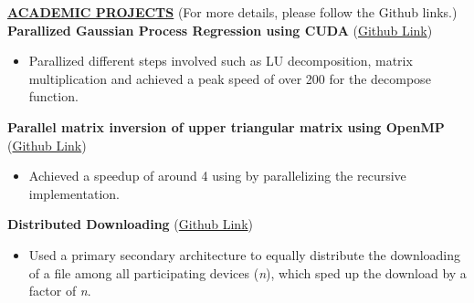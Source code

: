 \documentclass{article}
\begin{document}
%
%

\noindent \textbf{\underline{ACADEMIC PROJECTS}} (For more details, please follow the Github links.) \\
\noindent \textbf{Parallized Gaussian Process Regression using CUDA} (\href{https://github.com/biradarganesh25/Parallized-Gaussian-Process-Regression-using-CUDA}{Github Link})
\begin{itemize}[noitemsep,nolistsep,leftmargin=*]
	\item {Parallized different steps involved such as LU decomposition, matrix multiplication and achieved a peak speed of over 200 for the decompose function. \\}
\end{itemize}
\noindent \textbf{Parallel matrix inversion of upper triangular matrix using OpenMP} (\href{https://github.com/biradarganesh25/Parallel-matrix-inversion}{Github Link})
\begin{itemize}[noitemsep,nolistsep,leftmargin=*]
	\item {Achieved a speedup of around 4 using by parallelizing the recursive implementation. \\}
\end{itemize}

\noindent \textbf{Distributed Downloading } (\href{https://git.io/JG49l}{Github Link})

\begin{itemize}[noitemsep,nolistsep,leftmargin=*]
	\item {Used a primary secondary architecture to equally distribute the downloading of a file among all participating devices (\textit{n}), which sped up the download by a factor of \textit{n}. \\}
\end{itemize}

\end{document}
